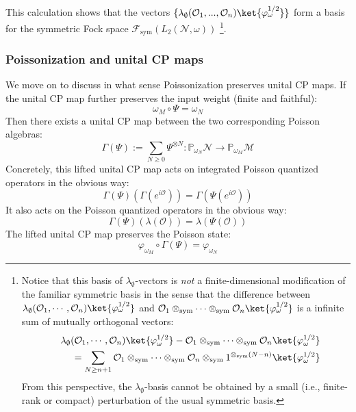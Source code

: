 \documentclass[a4paper,11pt]{article}
\theoremstyle{definition}
\numberwithin{equation}{section}
\newcommand{\lb}{\left(}
\newcommand{\rb}{\right)}
\newcommand{\nn}{\nonumber}
\begin{document}
This calculation shows that the vectors $\{\lambda_\emptyset(\mathcal{O}_1,...,\mathcal{O}_n)\ket{\varphi_\omega^{1/2}}\}$ form a basis for the symmetric Fock space $\mathcal{F}_\text{sym}\lb L_2(\mathcal{N},\omega)\rb$ \footnote{Notice that this basis of $\lambda_\emptyset$-vectors is \textit{not} a finite-dimensional modification of the familiar symmetric basis in the sense that the difference between $\lambda_\emptyset(\mathcal{O}_1,\cdots,\mathcal{O}_n)\ket{\varphi_\omega^{1/2}}$ and $\mathcal{O}_1\otimes_\text{sym}\cdots\otimes_\text{sym}\mathcal{O}_n\ket{\varphi_\omega^{1/2}}$ is a infinite sum of mutually orthogonal vectors:
\begin{eqnarray}
&&\lambda_\emptyset(\mathcal{O}_1,\cdots,\mathcal{O}_n)\ket{\varphi_\omega^{1/2}} - \mathcal{O}_1\otimes_\text{sym}\cdots\otimes_\text{sym}\mathcal{O}_n\ket{\varphi_\omega^{1/2}} \nn\\
&&= \sum_{N\geq n+1}\mathcal{O}_1\otimes_\text{sym}\cdots\otimes_\text{sym} \mathcal{O}_n\otimes_\text{sym} 1^{\otimes_\text{sym}(N-n)}\ket{\varphi_\omega^{1/2}} 
\end{eqnarray}
From this perspective, the $\lambda_\emptyset$-basis cannot be obtained by a small (i.e., finite-rank or compact) perturbation of the usual symmetric basis.}.

\subsubsection{Poissonization and unital CP maps}

We move on to discuss in what sense Poissonization preserves unital CP maps. If the unital CP map further preserves the input weight (finite and faithful):
\begin{equation}
    \omega_M\circ \Psi = \omega_N
\end{equation}
Then there exists a unital CP map between the two corresponding Poisson algebras:
\begin{equation}
    \Gamma(\Psi):=\sum_{N\geq 0}\Psi^{\otimes N}:\mathbb{P}_{\omega_N}\mathcal{N}\rightarrow\mathbb{P}_{\omega_M}\mathcal{M}
\end{equation}
Concretely, this lifted unital CP map acts on integrated Poisson quantized operators in the obvious way:
\begin{equation}
    \Gamma(\Psi)\lb\Gamma(e^{i\mathcal{O}})\rb = \Gamma\lb\Psi(e^{i\mathcal{O}})\rb
\end{equation}
It also acts on the Poisson quantized operators in the obvious way:
\begin{equation}
    \Gamma(\Psi)\lb\lambda(\mathcal{O})\rb = \lambda\lb\Psi(\mathcal{O})\rb
\end{equation}
The lifted unital CP map preserves the Poisson state:
\begin{equation}
    \varphi_{\omega_M}\circ\Gamma(\Psi) = \varphi_{\omega_N}
\end{equation}
\end{document}
